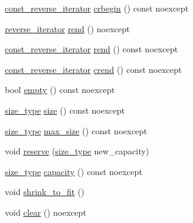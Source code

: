 \begin{DoxyCompactItemize}
\mbox{\hyperlink{classmage_1_1_component_manager_a00481d8beab5d950124f54c0f832da53}{const\+\_\+reverse\+\_\+iterator}} \mbox{\hyperlink{classmage_1_1_component_manager_ade414af14d8e7af5236b5a93b1741ab7}{crbegin}} () const noexcept
\item 
\mbox{\hyperlink{classmage_1_1_component_manager_a33e3e4994e4ec77e3ab587d68dbb8277}{reverse\+\_\+iterator}} \mbox{\hyperlink{classmage_1_1_component_manager_a6e726758abf9820cdc48223bc31e48b5}{rend}} () noexcept
\item 
\mbox{\hyperlink{classmage_1_1_component_manager_a00481d8beab5d950124f54c0f832da53}{const\+\_\+reverse\+\_\+iterator}} \mbox{\hyperlink{classmage_1_1_component_manager_a5a9937ca77be59c37762e91d444a0d72}{rend}} () const noexcept
\item 
\mbox{\hyperlink{classmage_1_1_component_manager_a00481d8beab5d950124f54c0f832da53}{const\+\_\+reverse\+\_\+iterator}} \mbox{\hyperlink{classmage_1_1_component_manager_acc2979afe7b7c7a522471c898524d9c4}{crend}} () const noexcept
\item 
bool \mbox{\hyperlink{classmage_1_1_component_manager_af5382446371a03c94301328ab768e919}{empty}} () const noexcept
\item 
\mbox{\hyperlink{classmage_1_1_component_manager_a6bd219525db9ec9f3adb9259e52674da}{size\+\_\+type}} \mbox{\hyperlink{classmage_1_1_component_manager_a6270cd0248b48e7de34421b34fc774c9}{size}} () const noexcept
\item 
\mbox{\hyperlink{classmage_1_1_component_manager_a6bd219525db9ec9f3adb9259e52674da}{size\+\_\+type}} \mbox{\hyperlink{classmage_1_1_component_manager_a43d6a22901bc502d908e738c550b1fbe}{max\+\_\+size}} () const noexcept
\item 
void \mbox{\hyperlink{classmage_1_1_component_manager_a836cb7e3e2e901d5bf2d219b2b4119c6}{reserve}} (\mbox{\hyperlink{classmage_1_1_component_manager_a6bd219525db9ec9f3adb9259e52674da}{size\+\_\+type}} new\+\_\+capacity)
\item 
\mbox{\hyperlink{classmage_1_1_component_manager_a6bd219525db9ec9f3adb9259e52674da}{size\+\_\+type}} \mbox{\hyperlink{classmage_1_1_component_manager_a1250375057e81290626d710880d19b1c}{capacity}} () const noexcept
\item 
void \mbox{\hyperlink{classmage_1_1_component_manager_a5cad9b6765b1088761b008cc964f1e47}{shrink\+\_\+to\+\_\+fit}} ()
\item 
void \mbox{\hyperlink{classmage_1_1_component_manager_a3aeebdd5734ecea5cac0b26d4ccff75d}{clear}} () noexcept
\item 

\end{DoxyCompactItemize}
